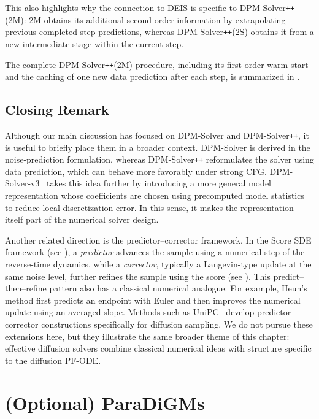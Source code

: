 This also highlights why the connection to DEIS is specific to
DPM-Solver\texttt{++}(2M): 2M obtains its additional second-order information
by extrapolating previous completed-step predictions, whereas
DPM-Solver\texttt{++}(2S) obtains it from a new intermediate stage within the
current step.

The complete DPM-Solver\texttt{++}(2M) procedure, including its first-order
warm start and the caching of one new data prediction after each step, is
summarized in .


\subsection{Closing Remark}
Although our main discussion has focused on DPM-Solver and
DPM-Solver\texttt{++}, it is useful to briefly place them in a broader
context. DPM-Solver is derived in the noise-prediction formulation, whereas
DPM-Solver\texttt{++} reformulates the solver using data prediction, which
can behave more favorably under strong CFG. DPM-Solver-v3~\citep{zheng2023dpm}
takes this idea further by introducing a more general model representation
whose coefficients are chosen using precomputed model statistics to reduce
local discretization error. In this sense, it makes the representation itself
part of the numerical solver design.

Another related direction is the predictor--corrector framework. In the Score
SDE framework (see ), a \emph{predictor} advances the
sample using a numerical step of the reverse-time dynamics, while a
\emph{corrector}, typically a Langevin-type update at the same noise level,
further refines the sample using the score (see ). This
predict--then--refine pattern also has a classical numerical analogue. For
example, Heun's method first predicts an endpoint with Euler and then improves
the numerical update using an averaged slope. Methods such as
UniPC~\citep{zhao2023unipc} develop predictor--corrector constructions
specifically for diffusion sampling. We do not pursue these extensions here,
but they illustrate the same broader theme of this chapter: effective
diffusion solvers combine classical numerical ideas with structure specific
to the diffusion PF-ODE.




\clearpage
\newpage




\section{\texorpdfstring{(Optional) ParaDiGMs}{(Optional) ParaDiGMs}}\label{sec:picard}


